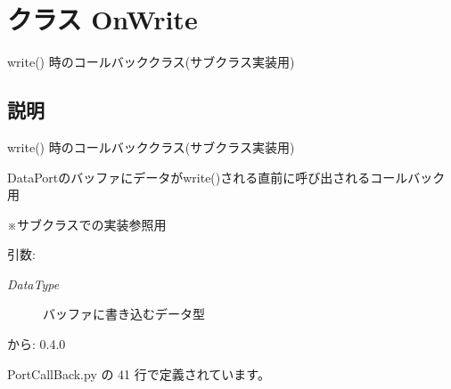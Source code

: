 \section{クラス OnWrite}
\label{classsource__py_1_1_port_call_back_1_1_on_write}
write() 時のコールバッククラス(サブクラス実装用)  




\subsection{説明}
write() 時のコールバッククラス(サブクラス実装用) 

DataPortのバッファにデータがwrite()される直前に呼び出されるコールバック用\par
 ※サブクラスでの実装参照用

\begin{Desc}
\item[引数:]
\begin{description}
\item[{\em DataType}]バッファに書き込むデータ型\end{description}
\end{Desc}
\begin{Desc}
\item[から:]0.4.0 \end{Desc}


 PortCallBack.py の 41 行で定義されています。